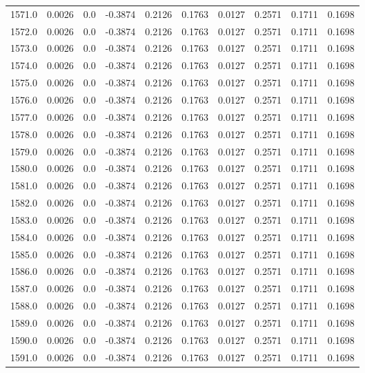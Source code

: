 \begin{longtable}{lrrrrrrrrr}
1571.0 & 0.0026 & 0.0 & -0.3874 & 0.2126 & 0.1763 & 0.0127 & 0.2571 & 0.1711 & 0.1698 \\
1572.0 & 0.0026 & 0.0 & -0.3874 & 0.2126 & 0.1763 & 0.0127 & 0.2571 & 0.1711 & 0.1698 \\
1573.0 & 0.0026 & 0.0 & -0.3874 & 0.2126 & 0.1763 & 0.0127 & 0.2571 & 0.1711 & 0.1698 \\
1574.0 & 0.0026 & 0.0 & -0.3874 & 0.2126 & 0.1763 & 0.0127 & 0.2571 & 0.1711 & 0.1698 \\
1575.0 & 0.0026 & 0.0 & -0.3874 & 0.2126 & 0.1763 & 0.0127 & 0.2571 & 0.1711 & 0.1698 \\
1576.0 & 0.0026 & 0.0 & -0.3874 & 0.2126 & 0.1763 & 0.0127 & 0.2571 & 0.1711 & 0.1698 \\
1577.0 & 0.0026 & 0.0 & -0.3874 & 0.2126 & 0.1763 & 0.0127 & 0.2571 & 0.1711 & 0.1698 \\
1578.0 & 0.0026 & 0.0 & -0.3874 & 0.2126 & 0.1763 & 0.0127 & 0.2571 & 0.1711 & 0.1698 \\
1579.0 & 0.0026 & 0.0 & -0.3874 & 0.2126 & 0.1763 & 0.0127 & 0.2571 & 0.1711 & 0.1698 \\
1580.0 & 0.0026 & 0.0 & -0.3874 & 0.2126 & 0.1763 & 0.0127 & 0.2571 & 0.1711 & 0.1698 \\
1581.0 & 0.0026 & 0.0 & -0.3874 & 0.2126 & 0.1763 & 0.0127 & 0.2571 & 0.1711 & 0.1698 \\
1582.0 & 0.0026 & 0.0 & -0.3874 & 0.2126 & 0.1763 & 0.0127 & 0.2571 & 0.1711 & 0.1698 \\
1583.0 & 0.0026 & 0.0 & -0.3874 & 0.2126 & 0.1763 & 0.0127 & 0.2571 & 0.1711 & 0.1698 \\
1584.0 & 0.0026 & 0.0 & -0.3874 & 0.2126 & 0.1763 & 0.0127 & 0.2571 & 0.1711 & 0.1698 \\
1585.0 & 0.0026 & 0.0 & -0.3874 & 0.2126 & 0.1763 & 0.0127 & 0.2571 & 0.1711 & 0.1698 \\
1586.0 & 0.0026 & 0.0 & -0.3874 & 0.2126 & 0.1763 & 0.0127 & 0.2571 & 0.1711 & 0.1698 \\
1587.0 & 0.0026 & 0.0 & -0.3874 & 0.2126 & 0.1763 & 0.0127 & 0.2571 & 0.1711 & 0.1698 \\
1588.0 & 0.0026 & 0.0 & -0.3874 & 0.2126 & 0.1763 & 0.0127 & 0.2571 & 0.1711 & 0.1698 \\
1589.0 & 0.0026 & 0.0 & -0.3874 & 0.2126 & 0.1763 & 0.0127 & 0.2571 & 0.1711 & 0.1698 \\
1590.0 & 0.0026 & 0.0 & -0.3874 & 0.2126 & 0.1763 & 0.0127 & 0.2571 & 0.1711 & 0.1698 \\
1591.0 & 0.0026 & 0.0 & -0.3874 & 0.2126 & 0.1763 & 0.0127 & 0.2571 & 0.1711 & 0.1698 \\

\end{longtable}
